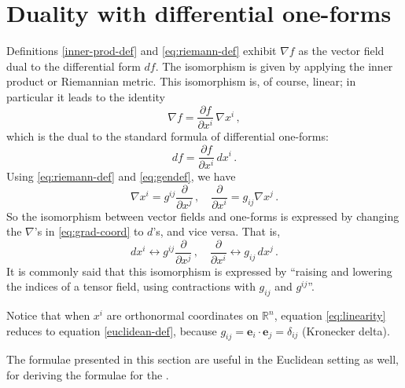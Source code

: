 \documentclass[12pt]{article}
\newcommand{\real}{\mathbb{R}}
\newcommand{\ve}{\mathbf{e}}
\begin{document}
\section{Duality with differential one-forms}
Definitions \eqref{inner-prod-def} and \eqref{eq:riemann-def}
exhibit $\nabla f$ as the vector field
dual to the differential form $df$.
The isomorphism is given by applying the inner product or Riemannian metric.
This isomorphism is, of course, linear;
in particular it leads to the identity
\begin{equation}\label{eq:linearity}
\nabla f = \frac{\partial f}{\partial x^i} \, \nabla x^i\,, 
\end{equation}
which is the dual to the standard formula of differential one-forms:
\[
df = \frac{\partial f}{\partial x^i} \, dx^i \,.
\]
Using \eqref{eq:riemann-def} and \eqref{eq:gendef},
we have
\begin{equation}\label{eq:grad-coord}
\nabla x^i = g^{ij} \frac{\partial}{\partial x^j} \,, \quad
\frac{\partial}{\partial x^i} = g_{ij} \nabla x^j\,.
\end{equation}
So the isomorphism between vector fields and one-forms
is expressed by changing
the $\nabla$'s in \eqref{eq:grad-coord} to $d$'s, and vice versa.  That is,
\begin{equation}
d x^i \leftrightarrow g^{ij}  \frac{\partial}{\partial x^j} \,, \quad
\frac{\partial}{\partial x^i} \leftrightarrow g_{ij} \, d x^j\,.
\end{equation}
It is commonly said that this isomorphism is expressed by 
``raising and lowering the indices of a tensor field,
using contractions with $g_{ij}$ and $g^{ij}$''.

\smallskip

Notice that when $x^i$ are orthonormal coordinates
on $\real^n$, equation \eqref{eq:linearity}
reduces to equation \eqref{euclidean-def}, because
$g_{ij} = \ve_i \cdot \ve_j = \delta_{ij}$ (Kronecker delta).

The formulae presented in this section are useful in the Euclidean setting as
well, for deriving the formulae for the .



\end{document}
